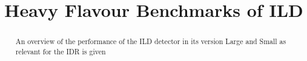 \documentclass[preprint]{elsarticle}
\newcommand{\ecal}{Si-W ECAL}
\newcommand{\ecalp}{\ecal\ physics prototype}
\newenvironment{bottompar}{\par\vspace*{\fill}}{\clearpage}
\begin{document}
%

\begin{frontmatter}

\title{\LARGE\bf Heavy Flavour Benchmarks of ILD}

%


\begin{abstract}
An overview of the performance of the ILD detector in its version Large and Small as relevant for the IDR is given 

\end{abstract}


\end{frontmatter}








\end{document}
